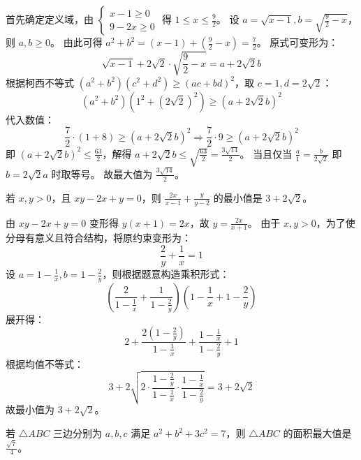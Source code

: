 \begin{questions}
\begin{solution}
首先确定定义域，由 $\begin{cases} x-1 \ge 0 \\ 9-2x \ge 0 \end{cases}$ 得 $1 \le x \le \frac{9}{2}$。
设 $a = \sqrt{x-1}, b = \sqrt{\frac{9}{2}-x}$，则 $a, b \ge 0$。
由此可得 $a^2 + b^2 = (x-1) + \left( \frac{9}{2}-x \right) = \frac{7}{2}$。
原式可变形为：
\[
\sqrt{x-1} + 2\sqrt{2} \cdot \sqrt{\frac{9}{2}-x} = a + 2\sqrt{2}b
\]
根据柯西不等式 $(a^2 + b^2)(c^2 + d^2) \ge (ac + bd)^2$，取 $c=1, d=2\sqrt{2}$：
\[
\left( a^2 + b^2 \right) \left( 1^2 + (2\sqrt{2})^2 \right) \ge (a + 2\sqrt{2}b)^2
\]
代入数值：
\[
\frac{7}{2} \cdot (1 + 8) \ge (a + 2\sqrt{2}b)^2 \Rightarrow \frac{7}{2} \cdot 9 \ge (a + 2\sqrt{2}b)^2
\]
即 $(a + 2\sqrt{2}b)^2 \le \frac{63}{2}$，解得 $a + 2\sqrt{2}b \le \sqrt{\frac{63}{2}} = \frac{3\sqrt{14}}{2}$。
当且仅当 $\frac{a}{1} = \frac{b}{2\sqrt{2}}$ 即 $b = 2\sqrt{2}a$ 时取等号。
故最大值为 $\frac{3\sqrt{14}}{2}$。
\end{solution}

\question 若 $x,y > 0$，且 $xy - 2x + y = 0$，则 $\frac{2x}{x-1} + \frac{y}{y-2}$ 的最小值是 $3+2\sqrt{2}$。

\begin{solution}
由 $xy - 2x + y = 0$ 变形得 $y(x+1) = 2x$，故 $y = \frac{2x}{x+1}$。
由于 $x,y > 0$，为了使分母有意义且符合结构，将原约束变形为：
\[
\frac{2}{y} + \frac{1}{x} = 1
\]
设 $a = 1 - \frac{1}{x}, b = 1 - \frac{2}{y}$，则根据题意构造乘积形式：
\[
\left( \frac{2}{1-\frac{1}{x}} + \frac{1}{1-\frac{2}{y}} \right) \left( 1-\frac{1}{x} + 1-\frac{2}{y} \right)
\]
展开得：
\[
2 + \frac{2 \left( 1-\frac{2}{y} \right)}{1-\frac{1}{x}} + \frac{1-\frac{1}{x}}{1-\frac{2}{y}} + 1
\]
根据均值不等式：
\[
3 + 2\sqrt{2 \cdot \frac{1-\frac{2}{y}}{1-\frac{1}{x}} \cdot \frac{1-\frac{1}{x}}{1-\frac{2}{y}}} = 3+2\sqrt{2}
\]
故最小值为 $3+2\sqrt{2}$。
\end{solution}

\question 若 $\triangle ABC$ 三边分别为 $a, b, c$ 满足 $a^2 + b^2 + 3c^2 = 7$，则 $\triangle ABC$ 的面积最大值是 $\frac{\sqrt{7}}{4}$。


\end{questions}
